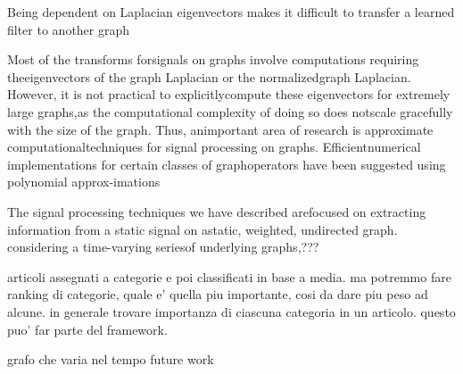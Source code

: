 Being dependent on Laplacian eigenvectors makes it difficult to transfer a learned filter to another graph

Most  of  the  transforms  forsignals  on  graphs  involve  computations  requiring  theeigenvectors  of  the  graph  Laplacian  or  the  normalizedgraph Laplacian. However, it is not practical to explicitlycompute  these  eigenvectors  for  extremely  large  graphs,as  the  computational  complexity  of  doing  so  does  notscale  gracefully  with  the  size  of  the  graph.  Thus,  animportant area of research is approximate computationaltechniques   for   signal   processing   on   graphs.   Efficientnumerical  implementations  for  certain  classes  of  graphoperators have been suggested using polynomial approx-imations

The  signal  processing  techniques  we  have  described  arefocused  on  extracting  information  from  a  static  signal  on  astatic,  weighted,  undirected  graph. considering a time-varying seriesof  underlying  graphs,???


articoli assegnati a categorie e poi classificati in base a media. ma potremmo fare ranking di categorie, quale e' quella piu importante, cosi da dare piu peso ad alcune. in generale trovare importanza di ciascuna categoria in un articolo. questo puo' far parte del framework.


grafo che varia nel tempo future work